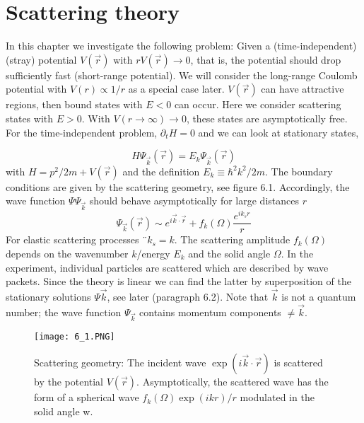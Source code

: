 \chapter{Scattering theory}
In this chapter we investigate the following problem: Given a (time-independent) (stray) potential $V(\vec{r})$ with $r V (\vec{r}) \rightarrow 0$, that is, the potential should drop sufficiently fast (short-range potential). We will consider the long-range Coulomb potential with $V (r) \propto 1 / r$ as a special case later. $V (\vec{r})$ can have attractive regions, then bound states with $E <0$ can occur. Here we consider scattering states with $E> 0$. With $V (r \rightarrow\infty) \rightarrow 0$, these states are asymptotically free. For the time-independent problem, $\partial_tH = 0$ and we can look at stationary states,

\begin{equation}
    H \Psi_{\vec{k}}(\vec{r})=E_{k} \Psi_{\vec{k}}(\vec{r})
    \end{equation}
with $H = p^2 / 2m + V (\vec{r})$ and the definition $E_k \equiv \hbar^2k^2 / 2m$. The boundary conditions are given by the scattering geometry, see figure 6.1. Accordingly, the wave function $Ψ \Psi_{\vec{k}}$ should behave asymptotically for large distances $r$
\begin{equation}
    \Psi_{\vec{k}}(\vec{r}) \sim e^{i \vec{k} \cdot \vec{r}}+f_{k}(\Omega) \frac{e^{i k_{s} r}}{r}
    \end{equation}
For elastic scattering processes $¨k_s = k$. The scattering amplitude $f_k (\Omega)$ depends on the wavenumber $k $/energy $E_k$ and the solid angle $\Omega$. In the experiment, individual particles are scattered which are described by wave packets. Since the theory is linear we can find the latter by superposition of the stationary solutions $Ψ\vec{k}$, see later (paragraph 6.2). Note that $\vec{k}$ is not a quantum number; the wave function $\Psi_{\vec{k}}$ contains momentum components $\neq\vec{k}$.
\begin{figure}[ht]
        \centering
        \texttt{[image: 6\_1.PNG]}
        \caption{Scattering geometry: The incident wave $\operatorname{exp}(i\vec{k}\cdot\vec{r})$ is scattered by the potential $V(\vec{r})$. Asymptotically, the scattered wave has the form of a spherical wave $f_k(\Omega)\operatorname{exp}(ikr)/r$ modulated in the solid angle w.}
\end{figure}
\\
